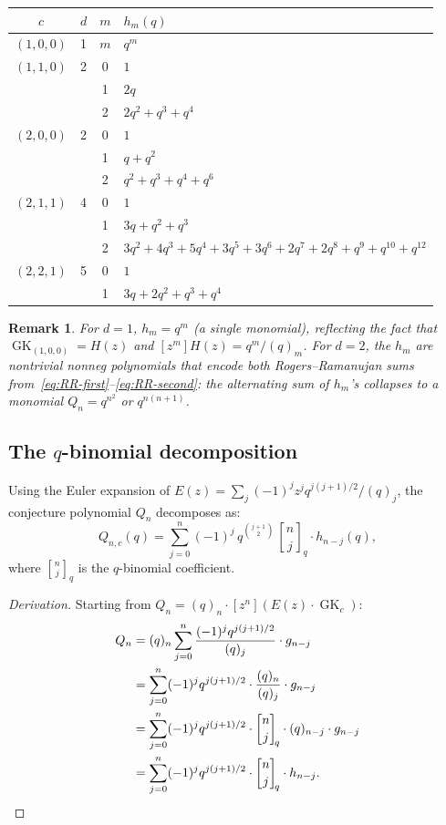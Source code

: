 \documentclass[11pt]{article}
\newtheorem{remark}[theorem]{Remark}
\newcommand{\GK}{\operatorname{GK}}
\newcommand{\qbin}[2]{\genfrac{[}{]}{0pt}{}{#1}{#2}}
\begin{document}
\begin{center}
\begin{tabular}{c|c|c|l}
$c$ & $d$ & $m$ & $h_m(q)$ \\
\hline
$(1,0,0)$ & 1 & $m$ & $q^m$ \\[2pt]
$(1,1,0)$ & 2 & 0 & $1$ \\
& & 1 & $2q$ \\
& & 2 & $2q^2 + q^3 + q^4$ \\[2pt]
$(2,0,0)$ & 2 & 0 & $1$ \\
& & 1 & $q + q^2$ \\
& & 2 & $q^2 + q^3 + q^4 + q^6$ \\[2pt]
$(2,1,1)$ & 4 & 0 & $1$ \\
& & 1 & $3q + q^2 + q^3$ \\
& & 2 & $3q^2 + 4q^3 + 5q^4 + 3q^5 + 3q^6 + 2q^7 + 2q^8 + q^9 + q^{10} + q^{12}$ \\[2pt]
$(2,2,1)$ & 5 & 0 & $1$ \\
& & 1 & $3q + 2q^2 + q^3 + q^4$ \\
\end{tabular}
\end{center}

\begin{remark}
For $d = 1$, $h_m = q^m$ (a single monomial), reflecting the fact that $\GK_{(1,0,0)} = H(z)$
and $[z^m] H(z) = q^m/(q)_m$.
For $d = 2$, the $h_m$ are nontrivial nonneg polynomials that encode
both Rogers--Ramanujan sums from~\eqref{eq:RR-first}--\eqref{eq:RR-second}:
the alternating sum of $h_m$'s collapses to a monomial $Q_n = q^{n^2}$ or $q^{n(n+1)}$.
\end{remark}

\subsection{The $q$-binomial decomposition}
\label{ssec:qbin-decomp}

Using the Euler expansion of $E(z) = \sum_j (-1)^j z^j q^{j(j+1)/2}/(q)_j$,
the conjecture polynomial $Q_n$ decomposes as:
\begin{equation}
  Q_{n,c}(q) = \sum_{j=0}^{n} (-1)^j\, q^{\binom{j+1}{2}}\,
  \qbin{n}{j}_{\!q} \cdot h_{n-j}(q),
  \label{eq:qbin-decomp}
\end{equation}
where $\qbin{n}{j}_q$ is the $q$-binomial coefficient.

\begin{proof}[Derivation]
Starting from $Q_n = (q)_n \cdot [z^n](E(z) \cdot \GK_c)$:
\begin{align*}
  Q_n &= (q)_n \sum_{j=0}^n \frac{(-1)^j q^{j(j+1)/2}}{(q)_j} \cdot g_{n-j} \\
      &= \sum_{j=0}^n (-1)^j q^{j(j+1)/2} \cdot
         \frac{(q)_n}{(q)_j} \cdot g_{n-j} \\
      &= \sum_{j=0}^n (-1)^j q^{j(j+1)/2} \cdot
         \qbin{n}{j}_{\!q} \cdot (q)_{n-j} \cdot g_{n-j} \\
      &= \sum_{j=0}^n (-1)^j q^{j(j+1)/2} \cdot
         \qbin{n}{j}_{\!q} \cdot h_{n-j}. \qedhere
\end{align*}
\end{proof}
\end{document}
